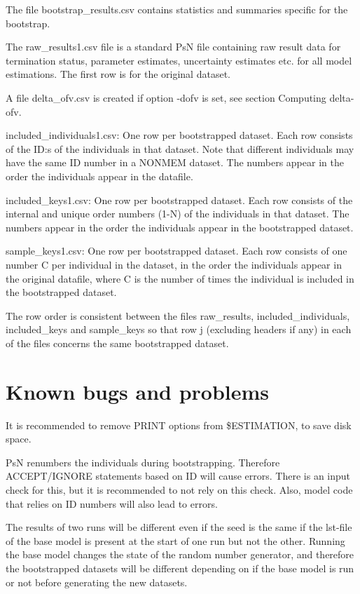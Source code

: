 The file bootstrap\_results.csv contains statistics and summaries specific for the bootstrap.

The raw\_results1.csv file is a standard PsN file containing raw result data for termination status, parameter estimates, uncertainty estimates etc. for all model estimations. The first row is for the original dataset.

A file delta\_ofv.csv is created if option -dofv is set, see section Computing delta-ofv.

included\_individuals1.csv: One row per bootstrapped dataset. Each row consists of the ID:s of the individuals in that dataset. Note that different individuals may have the same ID number in a NONMEM dataset. The numbers appear in the order the individuals appear in the datafile.

included\_keys1.csv: One row per bootstrapped dataset. Each row consists of the internal and unique order numbers (1-N) of the individuals in that dataset. The numbers appear in the order the individuals appear in the bootstrapped dataset. 

sample\_keys1.csv:  One row per bootstrapped dataset. Each row consists of one number C per individual in the dataset, in the order the individuals appear in the original datafile, where C is the number of times the individual is included in the bootstrapped dataset. 

The row order is consistent between the files raw\_results, included\_individuals, included\_keys and sample\_keys so that row j (excluding headers if any) in each of the files concerns the same bootstrapped dataset.

\section{Known bugs and problems}

It is recommended to remove PRINT options from \$ESTIMATION, to save disk space.

PsN renumbers the individuals during bootstrapping. Therefore ACCEPT/IGNORE statements based on ID will cause errors. 
There is an input check for this, but it is recommended to not rely on this check. Also, model code that relies on ID numbers will also lead to
errors.

The results of two runs will be different even if the seed is the same if the lst-file of the base model is present at the start of one run but not the other. Running the base model changes the state of the random number generator, and therefore the bootstrapped datasets will be different depending on if the base model is run or not before generating the  new datasets. 

